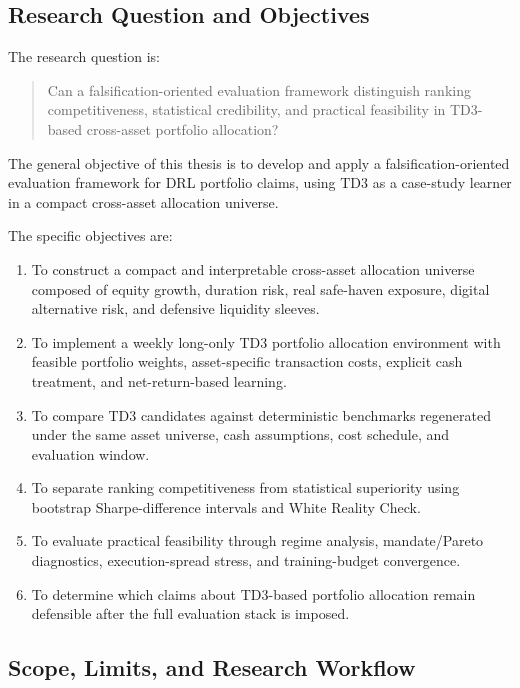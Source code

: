\documentclass[12pt]{article}
\begin{document}
\subsection{Research Question and Objectives}

The research question is:

\begin{quote}
Can a falsification-oriented evaluation framework distinguish ranking competitiveness, statistical credibility, and practical feasibility in TD3-based cross-asset portfolio allocation?
\end{quote}

The general objective of this thesis is to develop and apply a falsification-oriented evaluation framework for DRL portfolio claims, using TD3 as a case-study learner in a compact cross-asset allocation universe.

The specific objectives are:

\begin{enumerate}[label=\arabic*.,leftmargin=*,itemsep=2pt,parsep=0pt,topsep=4pt]
    \item To construct a compact and interpretable cross-asset allocation universe composed of equity growth, duration risk, real safe-haven exposure, digital alternative risk, and defensive liquidity sleeves.
    \item To implement a weekly long-only TD3 portfolio allocation environment with feasible portfolio weights, asset-specific transaction costs, explicit cash treatment, and net-return-based learning.
    \item To compare TD3 candidates against deterministic benchmarks regenerated under the same asset universe, cash assumptions, cost schedule, and evaluation window.
    \item To separate ranking competitiveness from statistical superiority using bootstrap Sharpe-difference intervals and White Reality Check.
    \item To evaluate practical feasibility through regime analysis, mandate/Pareto diagnostics, execution-spread stress, and training-budget convergence.
    \item To determine which claims about TD3-based portfolio allocation remain defensible after the full evaluation stack is imposed.
\end{enumerate}

\subsection{Scope, Limits, and Research Workflow}
\end{document}
